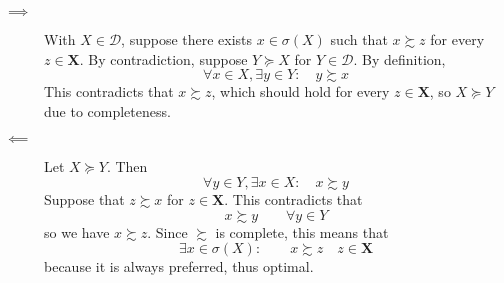 \documentclass[12pt]{extarticle}
\numberwithin{table}{section}
\numberwithin{figure}{section}
\numberwithin{equation}{section}
\begin{document}
\begin{description}
    \item[$\implies$]
          With $X \in \mathcal{D}$, suppose there exists $x \in \sigma(X)$ such that $x \succsim z$ for every $z \in \mathbf{X}$.
          By contradiction, suppose $Y \succeq X$ for $Y \in \mathcal{D}$.
          By definition,
          \begin{equation}
              \forall x \in X, \exists y \in Y\colon\quad y \succsim x
          \end{equation}
          This contradicts that $x \succsim z$, which should hold for every $z \in \mathbf{X}$, so $X \succeq Y$ due to completeness.
    \item[$\impliedby$]
          Let $X \succeq Y$.
          Then
          \begin{equation}
              \forall y \in Y, \exists x \in X\colon\quad x \succsim y
          \end{equation}
          Suppose that $z \succsim x$ for $z \in \mathbf{X}$.
          This contradicts that
          \begin{equation}
              x \succsim y \qquad \forall y \in Y
          \end{equation}
          so we have $x \succsim z$. Since $\succsim$ is complete, this means that
          \begin{equation}
              \exists x \in \sigma(X) \colon\qquad x \succsim z \quad z \in \mathbf{X}
          \end{equation}
          because it is always preferred, thus optimal.
\end{description}
\end{document}
